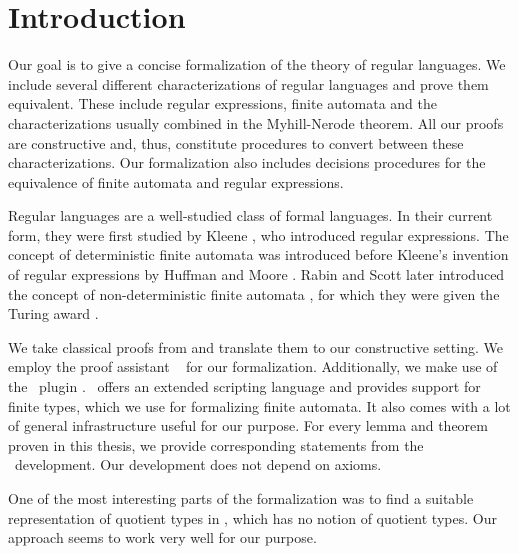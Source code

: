 \chapter{Introduction}
\label{chap:intro}

Our goal is to give a concise formalization of the theory of regular languages. 
We include several different characterizations of regular languages and prove them equivalent.
These include regular expressions, finite automata and the characterizations usually combined in the Myhill-Nerode theorem.
All our proofs are constructive and, thus, constitute procedures to convert between these characterizations.
Our formalization also includes decisions procedures for the equivalence of finite automata and regular expressions.

Regular languages are a well-studied class of formal languages. 
In their current form, they were first studied by Kleene \cite{KleeneNets}, who introduced regular expressions. 
The concept of deterministic finite automata was introduced before Kleene's invention of regular expressions by Huffman \cite{Huffman1954161} and Moore \cite{Moore56}. 
Rabin and Scott later introduced the concept of non-deterministic finite automata \cite{Rabin:1959:FAD:1661907.1661909}, for which they were given the Turing award \cite{Ashenhurst:1987:ATA:27609}.

We take classical proofs from \cite{DBLP:books/daglib/0088160} and translate them to our constructive setting. 
We employ the proof assistant \coq\ \cite{Coq:manual} for our formalization.
Additionally, we make use of the \ssreflect\ plugin \cite{gonthier:inria-00258384}. 
\ssreflect\ offers an extended scripting language and provides support for finite types, which we use for formalizing finite automata. 
It also comes with a lot of general infrastructure useful for our purpose.
For every lemma and theorem proven in this thesis, we provide corresponding statements from the \coq\ development. 
Our development does not depend on axioms.

One of the most interesting parts of the formalization was to find a suitable representation of quotient types in \coq, which has no notion of quotient types.
Our approach seems to work very well for our purpose.



